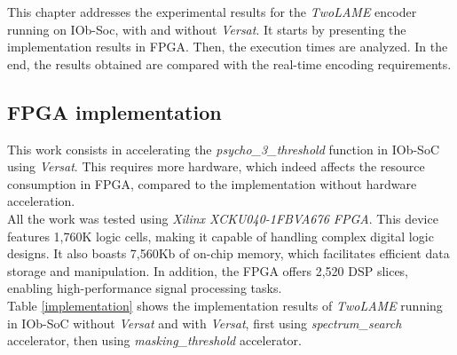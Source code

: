 



This chapter addresses the experimental results for the \textit{TwoLAME} encoder running on IOb-Soc, with and without \textit{Versat}.
It starts by presenting the implementation results in FPGA. Then, the execution times are analyzed. In the end, the results obtained are compared with the real-time encoding requirements.

\subsection{FPGA implementation}
This work consists in accelerating the \textit{psycho\_3\_threshold} function in IOb-SoC using \textit{Versat}. This requires more hardware, which indeed affects the resource consumption in FPGA, compared to the implementation without hardware acceleration. \\
All the work was tested using \textit{Xilinx XCKU040-1FBVA676 FPGA}. This device features 1,760K logic cells, making it capable of handling complex digital logic designs. It also boasts 7,560Kb of on-chip memory, which facilitates efficient data storage and manipulation. In addition, the FPGA offers 2,520 DSP slices, enabling high-performance signal processing tasks. \\ 

Table \ref{implementation} shows the implementation results of \textit{TwoLAME} running in IOb-SoC without \textit{Versat} and with \textit{Versat}, first using \textit{spectrum\_search} accelerator, then using \textit{masking\_threshold} accelerator.

\vspace{1cm}

